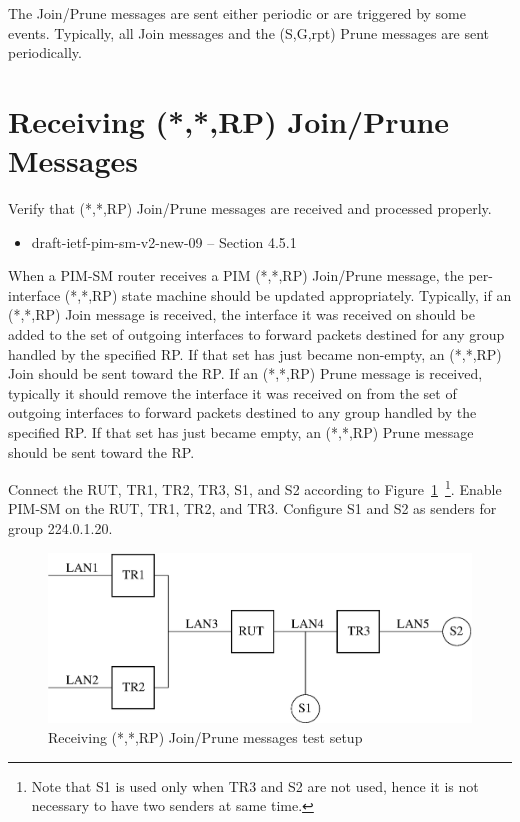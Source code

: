 \documentclass[11pt]{report}
\begin{document}
The Join/Prune messages are sent either periodic or are triggered by
some events. Typically, all Join messages and the (S,G,rpt) Prune
messages are sent periodically.

\newpage
\section{Receiving (*,*,RP) Join/Prune Messages}

Verify that (*,*,RP) Join/Prune messages are received and processed
properly.

\begin{itemize}
  \item draft-ietf-pim-sm-v2-new-09 -- Section 4.5.1
\end{itemize}

When a PIM-SM router receives a PIM (*,*,RP) Join/Prune message, the
per-interface (*,*,RP) state machine should be updated appropriately.
Typically, if an (*,*,RP) Join message is received, the interface it was
received on should be added to the set of outgoing interfaces to
forward packets destined for any group handled by the specified RP.
If that set has just became non-empty, an (*,*,RP) Join should be sent
toward the RP.
If an (*,*,RP) Prune message is received, typically it should remove
the interface it was received on from the set of outgoing interfaces
to forward packets destined to any group handled by the specified RP. If
that set has just became empty, an (*,*,RP) Prune message should be
sent toward the RP.

Connect the RUT, TR1, TR2, TR3, S1, and S2 according to
Figure~\ref{fig:pim_test_4_1_receiving_rp_join_prune_messages}~\footnote{Note
that S1 is used only when TR3 and S2 are not used, hence it is not necessary
to have two senders at same time.}.
Enable PIM-SM on the RUT, TR1, TR2, and TR3.
Configure S1 and S2 as senders for group 224.0.1.20.

\begin{figure}[htbp]
  \begin{center}
    \includegraphics[scale=0.8]{figs/pim_test_4_1_receiving_rp_join_prune_messages}
    \caption{Receiving (*,*,RP) Join/Prune messages test setup}
    \label{fig:pim_test_4_1_receiving_rp_join_prune_messages}
  \end{center}
\end{figure}
\end{document}
